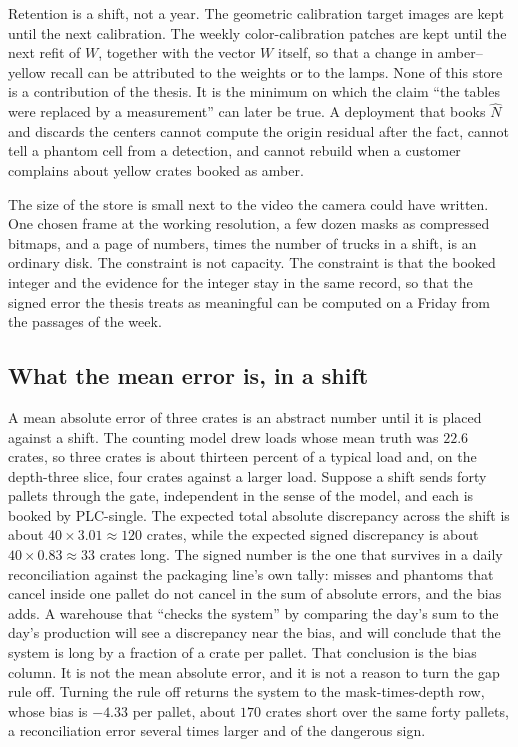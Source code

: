 Retention is a shift, not a year. The geometric calibration target images are kept until the next calibration. The weekly color-calibration patches are kept until the next refit of $W$, together with the vector $W$ itself, so that a change in amber--yellow recall can be attributed to the weights or to the lamps. None of this store is a contribution of the thesis. It is the minimum on which the claim ``the tables were replaced by a measurement'' can later be true. A deployment that books $\hat N$ and discards the centers cannot compute the origin residual after the fact, cannot tell a phantom cell from a detection, and cannot rebuild  when a customer complains about yellow crates booked as amber.

The size of the store is small next to the video the camera could have written. One chosen frame at the working resolution, a few dozen masks as compressed bitmaps, and a page of numbers, times the number of trucks in a shift, is an ordinary disk. The constraint is not capacity. The constraint is that the booked integer and the evidence for the integer stay in the same record, so that the signed error the thesis treats as meaningful can be computed on a Friday from the passages of the week.

\subsection{What the mean error is, in a shift}
\label{sec:shift}

A mean absolute error of three crates is an abstract number until it is placed against a shift. The counting model drew loads whose mean truth was $22.6$ crates, so three crates is about thirteen percent of a typical load and, on the depth-three slice, four crates against a larger load. Suppose a shift sends forty pallets through the gate, independent in the sense of the model, and each is booked by PLC-single. The expected total absolute discrepancy across the shift is about $40\times 3.01 \approx 120$ crates, while the expected signed discrepancy is about $40\times 0.83 \approx 33$ crates long. The signed number is the one that survives in a daily reconciliation against the packaging line's own tally: misses and phantoms that cancel inside one pallet do not cancel in the sum of absolute errors, and the bias adds. A warehouse that ``checks the system'' by comparing the day's sum to the day's production will see a discrepancy near the bias, and will conclude that the system is long by a fraction of a crate per pallet. That conclusion is the bias column. It is not the mean absolute error, and it is not a reason to turn the gap rule off. Turning the rule off returns the system to the mask-times-depth row, whose bias is $-4.33$ per pallet, about $170$ crates short over the same forty pallets, a reconciliation error several times larger and of the dangerous sign.

